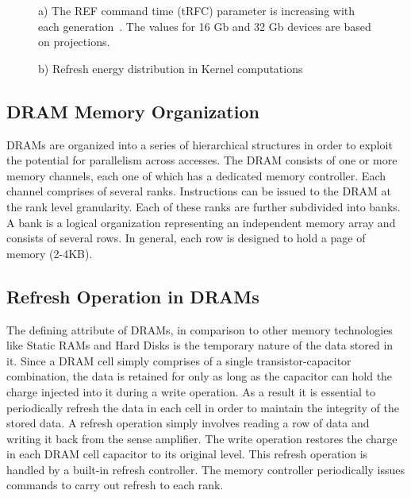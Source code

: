 \begin{figure}[ht!]
\begin{minipage}[b]{0.9\linewidth}
\centering
{}
\caption{\label{fig:refreshTrends}a) The REF command time (tRFC) parameter is increasing with each generation~\cite{jedec-sdram-standards}. The values for 16 Gb and 32 Gb devices are based on projections.}
\vspace{0.2in}
\end{minipage}
\addtocounter{figure}{-1}
\begin{minipage}[b]{1\linewidth}
\centering
{}
\caption{\label{fig:refreshTrends}b) Refresh energy distribution in Kernel computations}
\end{minipage}
\end{figure}

\subsection{DRAM Memory Organization}

DRAMs are organized into a series of hierarchical structures in order to exploit the potential for parallelism across accesses. The DRAM consists of one or more memory channels, each one of which has a dedicated memory controller. Each channel comprises of several ranks. Instructions can be issued to the DRAM at the rank level granularity. Each of these ranks are further subdivided into banks. A bank is a logical organization representing an independent memory array and consists of several rows. In general, each row is designed to hold a page of memory (2-4KB).

\subsection{Refresh Operation in DRAMs}
The defining attribute of DRAMs, in comparison to other memory technologies like Static RAMs and Hard Disks is the temporary nature of the data stored in it. Since a DRAM cell simply comprises of a single transistor-capacitor combination, the data is retained for only as long as the capacitor can hold the charge injected into it during a write operation. As a result it is essential to periodically refresh the data in each cell in order to maintain the integrity of the stored data. A refresh operation simply involves reading a row of data and writing it back from the sense amplifier. The write operation restores the charge in each DRAM cell capacitor to its original level. This refresh operation is handled by a built-in refresh controller. The memory controller periodically issues commands to carry out refresh to each rank.


